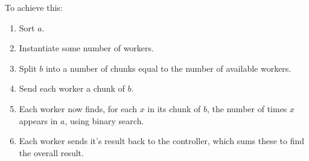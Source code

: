 To achieve this:
\begin{enumerate}
\item Sort $a$.
\item Instantiate some number of workers.
\item Split $b$ into a number of chunks equal to the number of available workers.
\item Send each worker a chunk of $b$.
\item Each worker now finds, for each $x$ in its chunk of $b$, the number of times $x$ appears in $a$, using binary search.
\item Each worker sends it's result back to the controller, which sums these to find the overall result.
\end{enumerate}
